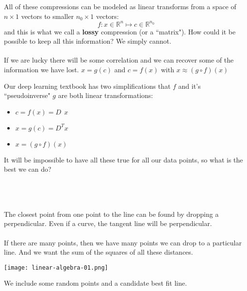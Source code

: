 \documentclass[12pt]{article}
\begin{document}
All of these compressions can be modeled as linear transforms from a space of $n \times 1 $ vectors to smaller $n_0 \times 1$ vectors:
$$ f: x \in \mathbb{R}^n \mapsto c \in \mathbb{R}^{n_0} $$
and this is what we call a \textbf{lossy} compression (or a ``matrix").  How could it be possible to keep all this information?  We simply cannot. \\ \\
If we are lucky there will be some correlation and we can recover some of the information we have lost. $x = g(c) $ and $c = f(x)$ with $x \approx (g \circ f)(x)$ 

\newpage

\noindent Our deep learning textbook has two simplifications that $f$ and it's ``pseudoinverse" $g$ are both linear transformations:
\begin{itemize}
\item $c = f(x) = D\;\,x$
\item $x = g(c) = D^T x$
\item $x = (g \circ f)(x) $
\end{itemize}
It will be impossible to have all these true for all our data points, so what is the best we can do? \\ \\
 \\ \\
The closest point from one point to the line can be found by dropping a perpendicular.  Even if a curve, the tangent line will be perpendicular. \\ \\
If there are many points, then we have many points we can drop to a particular line.  And we want the sum of the squares of all these distances.

\texttt{[image: linear-algebra-01.png]}

\noindent We include some random points and a candidate best fit line.
\end{document}

